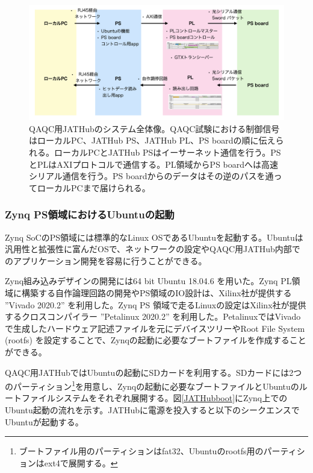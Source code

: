 \begin{figure} 
\centering
\includegraphics[width=16cm]{fig/QAQC/JAThubinfra.png}
\caption[QAQC用JATHubのシステム全体像]{QAQC用JATHubのシステム全体像。QAQC試験における制御信号はローカルPC、JATHub PS、JATHub PL、PS boardの順に伝えられる。ローカルPCとJATHub PSはイーサーネット通信を行う。PSとPLはAXIプロトコルで通信する。PL領域からPS boardへは高速シリアル通信を行う。PS boardからのデータはその逆のパスを通ってローカルPCまで届けられる。}
\label{JAThubinfra}
\end{figure}

\subsubsection{Zynq PS領域におけるUbuntuの起動}
\baselineskip
\label{subsubsec_ubuntu}
Zynq SoCのPS領域には標準的なLinux OSであるUbuntuを起動する。Ubuntuは汎用性と拡張性に富んだOSで、ネットワークの設定やQAQC用JATHub内部でのアプリケーション開発を容易に行うことができる。

Zynq組み込みデザインの開発には64 bit Ubuntu 18.04.6 を用いた。Zynq PL領域に構築する自作論理回路の開発やPS領域のIO設計は、Xilinx社が提供する ”Vivado 2020.2” を利用した。Zynq PS 領域で走るLinuxの設定はXilinx社が提供するクロスコンパイラー ”Petalinux 2020.2” を利用した。PetalinuxではVivadoで生成したハードウェア記述ファイルを元にデバイスツリーやRoot File System (rootfs) を設定することで、Zynqの起動に必要なブートファイルを作成することができる。

QAQC用JATHubではUbuntuの起動にSDカードを利用する。SDカードには2つのパーティション\footnote{ブートファイル用のパーティションはfat32、Ubuntuのrootfs用のパーティションはext4で展開する。}を用意し、Zynqの起動に必要なブートファイルとUbuntuのルートファイルシステムをそれぞれ展開する。図\ref{JATHubboot}にZynq上でのUbuntu起動の流れを示す。JATHubに電源を投入すると以下のシークエンスでUbuntuが起動する。

